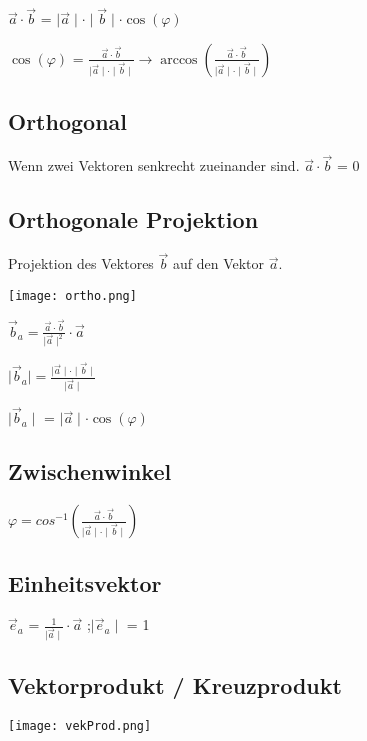 \begin{multicols*}{3}
{        $ \vec{a} \cdot \vec{b} $ = $ \mid \vec{a} \mid \cdot \mid \vec{b} \mid \cdot \cos(\varphi)$

        $\cos(\varphi) $ = $\frac{\vec{a} \cdot \vec{b}}{\mid \vec{a} \mid \cdot \mid \vec{b} \mid} \rightarrow \arccos(\frac{\vec{a} \cdot \vec{b}}{\mid \vec{a} \mid \cdot \mid \vec{b} \mid}) $
    }
    \WhiteSpace
    \subsection{Orthogonal}
    {Wenn zwei Vektoren senkrecht zueinander sind.}
    $ \vec{a} \cdot \vec{b} $ = 0
    \WhiteSpace
    \subsection{Orthogonale Projektion}
    {Projektion des Vektores $\vec{b} $ auf den Vektor $\vec{a} $.}
    \begin{multicols*}{2}
        {   \texttt{[image: ortho.png]}}

        \columnbreak

        $\vec{b}_a = \frac{\vec{a} \cdot  \vec{b}}{\mid \vec{a} \mid ^2} \cdot \vec{a} $

        $\mid \vec{b}_a  \mid  = \frac{\mid \vec{a} \mid \cdot \mid \vec{b} \mid}{\mid \vec{a} \mid }$

        $ \mid \vec{b}_a \mid $ = $\mid \vec{a} \mid \cdot \cos(\varphi)$

    \end{multicols*}

    \subsection{Zwischenwinkel}
    {$\varphi = cos^{-1}(\frac{\vec{a}\cdot\vec{b}}{\mid \vec{a} \mid \cdot \mid \vec{b} \mid}) $}
    \WhiteSpace
    \subsection{Einheitsvektor}
    {$\vec{e}_a $ = $\frac{1}{\mid \vec{a} \mid} \cdot \vec{a}$ ;$\mid \vec{e}_a \mid$ = 1}
    \subsection{Vektorprodukt / Kreuzprodukt}

    { \begin{multicols*}{2}
            {\texttt{[image: vekProd.png]}}
            \columnbreak


\end{multicols*}}
\end{multicols*}
